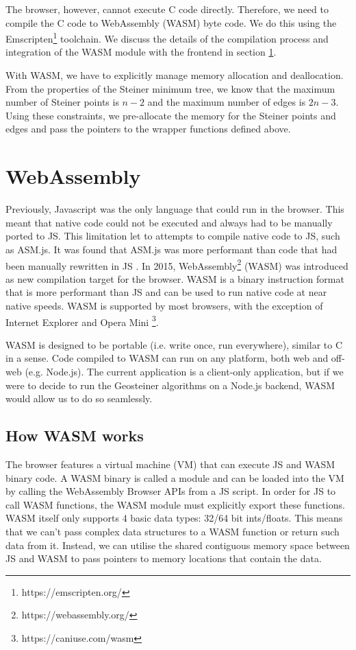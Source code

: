\documentclass{l4proj}
\begin{document}
The browser, however, cannot execute C code directly. Therefore, we need to compile the C code to WebAssembly (WASM) byte code. We do this using the Emscripten\footnote{https://emscripten.org/} toolchain.
We discuss the details of the compilation process and integration of the WASM module with the frontend in section \ref{sec:webassembly}.

With WASM, we have to explicitly manage memory allocation and deallocation. From the properties of the Steiner minimum tree, we know that the maximum number of Steiner points is $n - 2$ and the maximum number of edges is $2n - 3$. Using these constraints, we pre-allocate the memory for the Steiner points and edges and pass the pointers to the wrapper functions defined above.


\section{WebAssembly}
\label{sec:webassembly}
Previously, Javascript was the only language that could run in the browser. This meant that native code could not be executed and always had to be manually ported to JS.
This limitation let to attempts to compile native code to JS, such as ASM.js. It was found that ASM.js was more performant than code that had been manually rewritten in JS \citep{WebAssemblyIntro}.
In 2015, WebAssembly\footnote{https://webassembly.org/} (WASM) was introduced as new compilation target for the browser. WASM is a binary instruction format that is more performant than JS and can be used to run native code at near native speeds.
WASM is supported by most browsers, with the exception of Internet Explorer and Opera Mini \footnote{https://caniuse.com/wasm}.

WASM is designed to be portable (i.e. write once, run everywhere), similar to C in a sense. Code compiled to WASM can run on any platform, both web and off-web (e.g. Node.js).
The current application is a client-only application, but if we were to decide to run the Geosteiner algorithms on a Node.js backend, WASM would allow us to do so seamlessly.

\subsection{How WASM works}
The browser features a virtual machine (VM) that can execute JS and WASM binary code. A WASM binary is called a module and can be loaded into the VM by calling the WebAssembly Browser APIs from a JS script.
In order for JS to call WASM functions, the WASM module must explicitly export these functions. WASM itself only supports 4 basic data types: 32/64 bit ints/floats. This means that we can't pass complex data structures to a WASM function or return such data from it.
Instead, we can utilise the shared contiguous memory space between JS and WASM to pass pointers to memory locations that contain the data.
\end{document}

